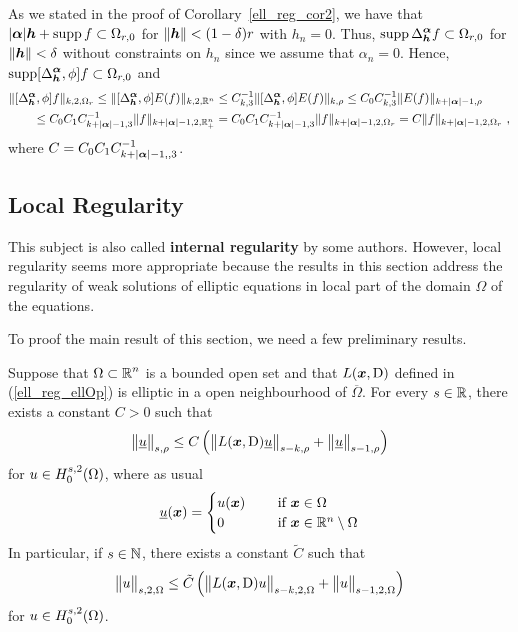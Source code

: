 \begin{rmk}
As we stated in the proof of Corollary~\ref{ell_reg_cor2},
we have that $|{\bm{\alpha}}| {\bm{h}} + \operatorname{supp} f \subset \Omega_{r,0}$
for $\|{\bm{h}}\| < (1-\delta)r$ with $h_n = 0$.    Thus,
$\displaystyle \operatorname{supp} \Delta^{{\bm{\alpha}}}_{{\bm{h}}} f \subset \Omega_{r,0}$ for
$\|{\bm{h}}\| < \delta$ without constraints on $h_n$ since we assume
that $\alpha_n = 0$.  Hence,
$\displaystyle \operatorname{supp} [\Delta^{{\bm{\alpha}}}_{{\bm{h}}}, \phi] f
\subset \Omega_{r,0}$
and
\begin{align*}
&\| [\Delta^{{\bm{\alpha}}}_{{\bm{h}}}, \phi] f \|_{k,2,\Omega_r}
\leq \| [\Delta^{{\bm{\alpha}}}_{{\bm{h}}}, \phi] E(f) \|_{k,2,\mathbb{R}^n}
\leq C_{k,3}^{-1} \| [\Delta^{{\bm{\alpha}}}_{{\bm{h}}}, \phi] E(f) \|_{k,\rho}
\leq C_0 C_{k,3}^{-1} \| E(f) \|_{k+|{\bm{\alpha}}|-1,\rho} \\
&\qquad \leq C_0 C_1 C_{k+|{\bm{\alpha}}|-1,3}^{-1}
\| f \|_{k+|{\bm{\alpha}}|-1,2,\mathbb{R}^n_+}
= C_0 C_1 C_{k+|{\bm{\alpha}}|-1,3}^{-1} \| f \|_{k+|{\bm{\alpha}}|-1,2,\Omega_r}
= C \| f \|_{k+|{\bm{\alpha}}|-1,2,\Omega_r} \ ,
\end{align*}
where $\displaystyle C = C_0 C_1 C_{k+|{\bm{\alpha}}|-1,,3}^{-1}$.
\end{rmk}

\subsection{Local Regularity} 

This subject is also called {\bfseries internal
regularity} by some authors.  However,
local regularity seems more appropriate because the results
in this section address the regularity of weak solutions of elliptic
equations in local part of the domain $\Omega$ of the equations.

To proof the main result of this section, we need a few preliminary results.

\begin{prop} \label{ell_reg_in}
Suppose that $\displaystyle \Omega \subset \mathbb{R}^n$ is a bounded open
set and that $L({\bm{x}},\operatorname{D})$ defined in (\ref{ell_reg_ellOp}) is
elliptic in a open neighbourhood of $\overline{\Omega}$. 
For every $s\in \mathbb{R}$, there exists a constant $C>0$ such that
\begin{equation} \label{ell_reg_in_eqt}
\big\|\underline{u} \big\|_{s,\rho} \leq C \left(
\big\| L({\bm{x}},\operatorname{D}) \underline{u} \big\|_{s-k,\rho}
+ \big\|\underline{u}\big\|_{s-1,\rho} \right)
\end{equation}
for $\displaystyle u \in H^{s,2}_0(\Omega)$, where as usual
\[
\underline{u}({\bm{x}}) = \begin{cases}
u({\bm{x}}) & \quad \ \text{if} \ {\bm{x}} \in \Omega \\
0 & \quad \ \text{if} \ {\bm{x}} \in \mathbb{R}^n\setminus \Omega  
\end{cases}
\]
In particular, if $s \in \mathbb{N}$, there exists a constant $\tilde{C}$ such that
\begin{equation} \label{ell_reg_in_eqtV2}
\big\|u \big\|_{s,2,\Omega} \leq \tilde{C} \left(
\big\| L({\bm{x}},\operatorname{D}) u \big\|_{s-k,2,\Omega}
+ \big\|u\big\|_{s-1,2,\Omega} \right)
\end{equation}
for $\displaystyle u \in H^{s,2}_0(\Omega)$.
\end{prop}

